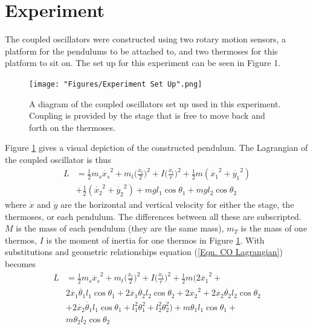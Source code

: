 \documentclass[twocolumn]{article}
\begin{document}
\section*{Experiment}
The coupled oscillators were constructed using two rotary motion sensors, a platform for the pendulums to be attached to, and two thermoses for this platform to sit on. The set up for this experiment can be seen in Figure 1.
\begin{figure}[h]
    \centering
    \texttt{[image: "Figures/Experiment Set Up".png]}
    \caption{\small{A diagram of the coupled oscillators set up used in this experiment. Coupling is provided by the stage that is free to move back and forth on the thermoses.}}
    \label{Fig. Diagram}
\end{figure}
\par \noindent
Figure \ref{Fig. Diagram} gives a visual depiction of the constructed pendulum. The Lagrangian of the coupled oscillator is thus
\begin{equation}\label{Eqn. CO Lagrangian}
\begin{split}
L&=\frac{1}{2}m_s\dot{x_{s}}^2+m_{t}\Big(\frac{\dot{x_{t}}}{2}\Big)^2+I\Big(\frac{\dot{x_t}}{r}\Big)^2+\frac{1}{2}m(\dot{x_1}^2+\dot{y_1}^2) \\&
+\frac{1}{2}(\dot{x_2}^2+\dot{y_2}^2)+mgl_{1}\cos{\theta_1}+mgl_{2}\cos{\theta_2}
\end{split}
\end{equation}
where $\dot{x}$ and $\dot{y}$ are the horizontal and vertical velocity for either the stage, the thermoses, or each pendulum. The differences between all these are subscripted. $M$ is the mass of each pendulum (they are the same mass), $m_{T}$ is the mass of one thermos, $I$ is the moment of inertia for one thermos in Figure \ref{Fig. Diagram}. With substitutions and geometric relationships equation (\ref{Eqn. CO Lagrangian}) becomes
\begin{equation}\label{Eqn. CO Modified Lagrangian}
\begin{split}
L&=\frac{1}{2}m_{s}\dot{x_s}^2+m_{t}\Big(\frac{\dot{x_t}}{2}\Big)^2+I\Big(\frac{\dot{x_t}}{r}\Big)^2+\frac{1}{2}m\Big(2\dot{x_1}^2+ \\&
2\dot{x_1}\dot{\theta_1}l_{1}\cos{\theta_1}+2\dot{x_1}\dot{\theta_2}l_{2}\cos{\theta_2}+2\dot{x_2}^2+2\dot{x_2}\dot{\theta_2}l_{2}\cos{\theta_2}\\& 
+2\dot{x_2}\dot{\theta_1}l_{1}\cos{\theta_1}+l_{1}^2\theta_{1}^2+l_{2}^2\theta_{2}^2\Big)+m\theta_{1}l_{1}\cos{\theta_{1}}+\\&
m\theta_{2}l_{2}\cos{\theta_{2}}  
\end{split}
\end{equation}
\end{document}
